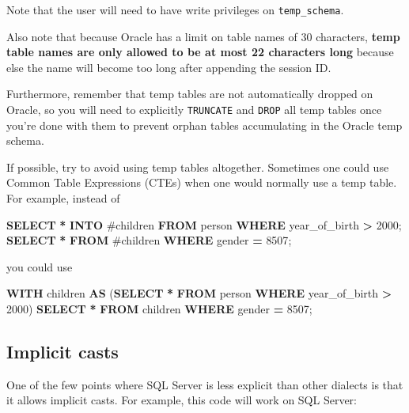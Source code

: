 \documentclass[
]{article}
\newenvironment{Shaded}{\begin{snugshade}}{\end{snugshade}}
\newcommand{\DecValTok}[1]{\textcolor[rgb]{0.00,0.00,0.81}{#1}}
\newcommand{\KeywordTok}[1]{\textcolor[rgb]{0.13,0.29,0.53}{\textbf{#1}}}
\newcommand{\NormalTok}[1]{#1}
\newcommand{\OperatorTok}[1]{\textcolor[rgb]{0.81,0.36,0.00}{\textbf{#1}}}
\begin{document}
Note that the user will need to have write privileges on
\texttt{temp\_schema}.

Also note that because Oracle has a limit on table names of 30
characters, \textbf{temp table names are only allowed to be at most 22
characters long} because else the name will become too long after
appending the session ID.

Furthermore, remember that temp tables are not automatically dropped on
Oracle, so you will need to explicitly \texttt{TRUNCATE} and
\texttt{DROP} all temp tables once you're done with them to prevent
orphan tables accumulating in the Oracle temp schema.

If possible, try to avoid using temp tables altogether. Sometimes one
could use Common Table Expressions (CTEs) when one would normally use a
temp table. For example, instead of

\begin{Shaded}
\begin{Highlighting}[]
\KeywordTok{SELECT} \OperatorTok{*} \KeywordTok{INTO}\NormalTok{ #children }\KeywordTok{FROM}\NormalTok{ person }\KeywordTok{WHERE}\NormalTok{ year_of_birth }\OperatorTok{>} \DecValTok{2000}\NormalTok{;}
\KeywordTok{SELECT} \OperatorTok{*} \KeywordTok{FROM}\NormalTok{ #children }\KeywordTok{WHERE}\NormalTok{ gender }\OperatorTok{=} \DecValTok{8507}\NormalTok{;}
\end{Highlighting}
\end{Shaded}

you could use

\begin{Shaded}
\begin{Highlighting}[]
\KeywordTok{WITH}\NormalTok{ children }\KeywordTok{AS}\NormalTok{ (}\KeywordTok{SELECT} \OperatorTok{*} \KeywordTok{FROM}\NormalTok{ person }\KeywordTok{WHERE}\NormalTok{ year_of_birth }\OperatorTok{>} \DecValTok{2000}\NormalTok{)}
\KeywordTok{SELECT} \OperatorTok{*} \KeywordTok{FROM}\NormalTok{ children }\KeywordTok{WHERE}\NormalTok{ gender }\OperatorTok{=} \DecValTok{8507}\NormalTok{;}
\end{Highlighting}
\end{Shaded}

\hypertarget{implicit-casts}{%
\subsection{Implicit casts}\label{implicit-casts}}

One of the few points where SQL Server is less explicit than other
dialects is that it allows implicit casts. For example, this code will
work on SQL Server:
\end{document}

